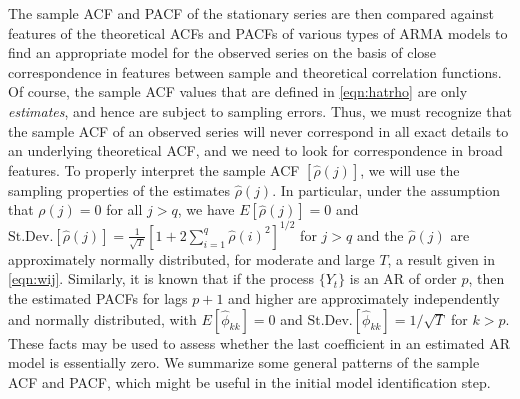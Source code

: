 The sample ACF and PACF of the stationary series are then compared against features of the theoretical ACFs and PACFs of various types of ARMA models to find an appropriate model for the observed series on the basis of close correspondence in features between sample and theoretical correlation functions. Of course, the sample ACF values that are defined in \eqref{eqn:hatrho} are only \emph{estimates}, and hence are subject to sampling errors. Thus, we must recognize that the sample ACF of an observed series will never correspond in all exact details to an underlying theoretical ACF, and we need to look for correspondence in broad features. To properly interpret the sample ACF $[\hat{\rho}(j)]$, we will use the sampling properties of the estimates $\hat{\rho}(j)$. In particular, under the assumption that $\rho(j) = 0$ for all $j  > q$, we have $E[\hat{\rho}(j)]= 0$ and $\text{St.Dev.}[\hat{\rho}(j)]= \frac{1}{\sqrt{T}}[1 + 2 \sum_{i=1}^q \hat{\rho}(i)^2]^{1/2}$ for $j > q$ and the $\hat{\rho}(j)$ are approximately normally distributed, for moderate and large $T$, a result given in \eqref{eqn:wij}. Similarly, it is known that if the process $\{Y_t\}$ is an AR of order $p$, then the estimated PACFs for lags $p + 1$ and higher are approximately independently and normally distributed, with $E[\hat{\phi}_{kk}] = 0$ and $\text{St.Dev.}[\hat{\phi}_{kk}] = 1/\sqrt{T}$ for $k > p$. These facts may be used to assess whether the last coefficient in an estimated AR model is essentially zero. We summarize some general patterns of the sample ACF and PACF, which might be useful in the initial model identification step. 


